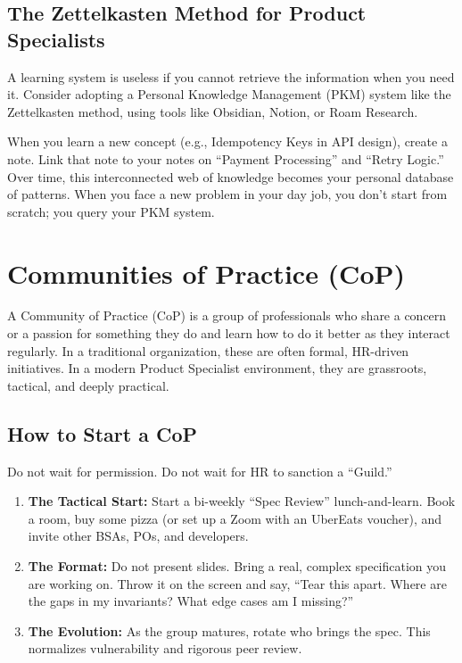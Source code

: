 \documentclass[
  11pt,
  openany,
  oneside]{book}
\providecommand{\tightlist}{%
  \setlength{\itemsep}{0pt}\setlength{\parskip}{0pt}}
\begin{document}
\subsection{The Zettelkasten Method for Product
Specialists}\label{the-zettelkasten-method-for-product-specialists}

A learning system is useless if you cannot retrieve the information when
you need it. Consider adopting a Personal Knowledge Management (PKM)
system like the Zettelkasten method, using tools like Obsidian, Notion,
or Roam Research.

When you learn a new concept (e.g., Idempotency Keys in API design),
create a note. Link that note to your notes on ``Payment Processing''
and ``Retry Logic.'' Over time, this interconnected web of knowledge
becomes your personal database of patterns. When you face a new problem
in your day job, you don't start from scratch; you query your PKM
system.

\bigskip

\section{Communities of Practice
(CoP)}\label{communities-of-practice-cop}

A Community of Practice (CoP) is a group of professionals who share a
concern or a passion for something they do and learn how to do it better
as they interact regularly. In a traditional organization, these are
often formal, HR-driven initiatives. In a modern Product Specialist
environment, they are grassroots, tactical, and deeply practical.

\subsection{How to Start a CoP}\label{how-to-start-a-cop}

Do not wait for permission. Do not wait for HR to sanction a ``Guild.''

\begin{enumerate}
\def\labelenumi{\arabic{enumi}.}
\tightlist
\item
  \textbf{The Tactical Start:} Start a bi-weekly ``Spec Review''
  lunch-and-learn. Book a room, buy some pizza (or set up a Zoom with an
  UberEats voucher), and invite other BSAs, POs, and developers.
\item
  \textbf{The Format:} Do not present slides. Bring a real, complex
  specification you are working on. Throw it on the screen and say,
  ``Tear this apart. Where are the gaps in my invariants? What edge
  cases am I missing?''
\item
  \textbf{The Evolution:} As the group matures, rotate who brings the
  spec. This normalizes vulnerability and rigorous peer review.
\end{enumerate}
\end{document}
